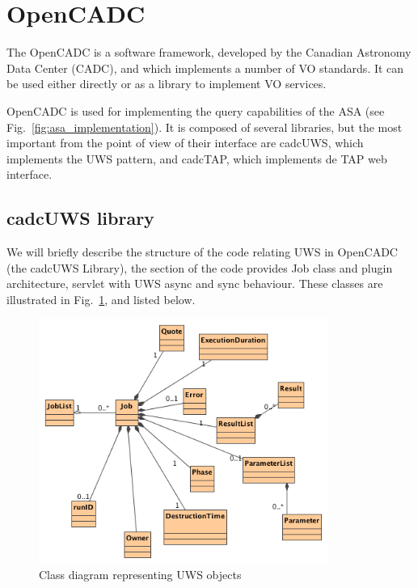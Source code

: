 

\section{OpenCADC} %
\label{sec:opencadc}

The
OpenCADC
is a software framework, developed by the
Canadian Astronomy Data Center (CADC), and which implements a number of VO standards. It can be used either directly or as a library to implement VO services.

OpenCADC is used for implementing the query capabilities of the ASA (see Fig.~\ref{fig:asa_implementation}). It is composed of several libraries, but the most important from the point of view of their interface are cadcUWS, which implements the UWS pattern, and cadcTAP, which implements de TAP web interface.

\subsection{cadcUWS library} %
\label{sub:cadcuws_library}

We will briefly describe
the structure of the code relating UWS in OpenCADC (the cadcUWS Library), the section of the code provides Job class and plugin architecture, servlet with UWS async and sync behaviour. These classes are illustrated in Fig.~\ref{fig:uwsjobs}, and listed below.

\begin{figure}[tb]
\centering
\includegraphics[height=8cm]{images/Class_Diagram__UWS__UWSObjects.png}
\caption{Class diagram representing UWS objects}
\label{fig:uwsjobs}
\end{figure}


